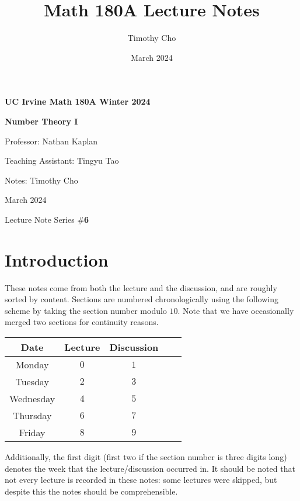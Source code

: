 \documentclass{article}
\title{Math 180A Lecture Notes}
\author{Timothy Cho}
\date{March 2024}
\begin{document}
\begin{titlepage}
    \begin{center}
        \vspace*{1cm}
            
        \Huge
        \textbf{UC Irvine Math 180A Winter 2024}
        
        \vspace{0.1 cm}
        \huge
        \textbf{Number Theory I}
        \vspace{0.4cm}
            
        \vspace{1.5cm}
        \Large    
        \textsf{Professor: Nathan Kaplan}

        \textsf{Teaching Assistant: Tingyu Tao}
        
        \textsf{Notes: Timothy Cho}
            
        \vfill
            

            
        \vspace{0.8cm}
            

        \Large
        March 2024

        Lecture Note Series \#\textbf{6}
            
    \end{center}
\end{titlepage}
\section*{Introduction}
These notes come from both the lecture and the discussion, and are roughly sorted by content. Sections are numbered chronologically using the following scheme by taking the section number modulo $10$. Note that we have occasionally merged two sections for continuity reasons.
\begin{center}
\begin{tabular}{|c|c|c|c|c|}\hline
Date & Lecture & Discussion \\ \hline
Monday & $0$ & $1$  \\
Tuesday & $2$ & $3$ \\
Wednesday & $4$ & $5$ \\
Thursday & $6$ & $7$ \\
Friday & $8$ & $9$ \\ \hline
\end{tabular}
\end{center}
Additionally, the first digit (first two if the section number is three digits long) denotes the week that the lecture/discussion occurred in. It should be noted that not every lecture is recorded in these notes: some lectures were skipped, but despite this the notes should be comprehensible.
\end{document}
